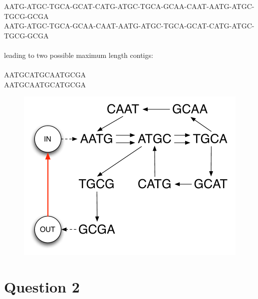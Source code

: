 \documentclass[a4paper,11pt]{article}
\begin{document}
\begin{enumerate}
\small{AATG-ATGC-TGCA-GCAT-CATG-ATGC-TGCA-GCAA-CAAT-AATG-ATGC-TGCG-GCGA}\\
\small{AATG-ATGC-TGCA-GCAA-CAAT-AATG-ATGC-TGCA-GCAT-CATG-ATGC-TGCG-GCGA}\\\\
\normalsize{leading to two possible maximum length contigs}:\\\\
AATGCATGCAATGCGA\\
AATGCAATGCATGCGA
\begin{figure}[h]
\centering\includegraphics[scale=0.5]{exam_graph_fig2.pdf}
\end{figure}
\end{enumerate}

\section*{Question 2}
\end{document}
